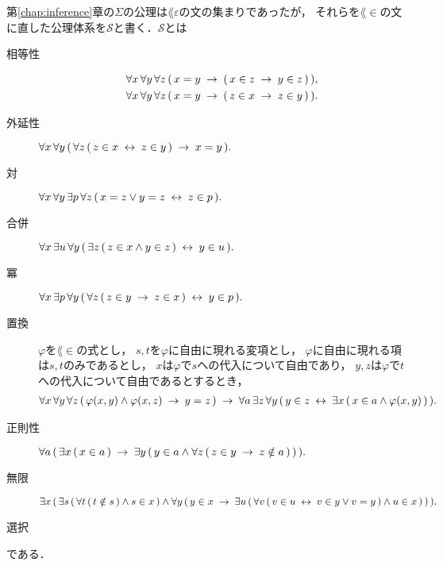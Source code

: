 	第\ref{chap:inference}章の$\Sigma$の公理は$\lang{\varepsilon}$の文の集まりであったが，
	それらを$\lang{\in}$の文に直した公理体系を$\mathscr{S}$と書く．$\mathscr{S}$とは
	\begin{description}
		\item[相等性] 
			\begin{align}
				&\forall x\, \forall y\, \forall z\, 
				(\, x = y \hspace{0.25em}\rightarrow\hspace{0.25em} (\, x \in z \hspace{0.25em}\rightarrow\hspace{0.25em} y \in z\, )\, ), \\
				&\forall x\, \forall y\, \forall z\, 
				(\, x = y \hspace{0.25em}\rightarrow\hspace{0.25em} (\, z \in x \hspace{0.25em}\rightarrow\hspace{0.25em} z \in y\, )\, ).
			\end{align}
			
		\item[外延性] $\forall x\, \forall y\, (\, \forall z\, 
			(\, z \in x \hspace{0.25em}\leftrightarrow\hspace{0.25em} z \in y\, ) \hspace{0.25em}\rightarrow\hspace{0.25em} x = y\, ).$
			
		\item[対] $\forall x\, \forall y\, \exists p\, \forall z\, 
			(\, x = z \vee y = z \hspace{0.25em}\leftrightarrow\hspace{0.25em} z \in p\, ).$
			
		\item[合併] $\forall x\, \exists u\, \forall y\, (\, \exists z\, (\, z \in x \wedge y \in z\, ) \hspace{0.25em}\leftrightarrow\hspace{0.25em} y \in u\, ).$
			
		\item[冪] $\forall x\, \exists p\, \forall y\, 
			(\, \forall z\, (\, z \in y \hspace{0.25em}\rightarrow\hspace{0.25em} z \in x\, ) \hspace{0.25em}\leftrightarrow\hspace{0.25em} y \in p\, ).$
			
		\item[置換] $\varphi$を$\lang{\in}$の式とし，
			$s,t$を$\varphi$に自由に現れる変項とし，
			$\varphi$に自由に現れる項は$s,t$のみであるとし，
			$x$は$\varphi$で$s$への代入について自由であり，
			$y,z$は$\varphi$で$t$への代入について自由であるとするとき，
			\begin{align}
				\forall x\, \forall y\, \forall z\, 
				(\, \varphi(x,y) \wedge \varphi(x,z)
				\hspace{0.25em}\rightarrow\hspace{0.25em} y = z\, )
				\hspace{0.25em}\rightarrow\hspace{0.25em} \forall a\, \exists z\, \forall y\,
				(\, y \in z \hspace{0.25em}\leftrightarrow\hspace{0.25em} \exists x\, (\, x \in a \wedge 
				\varphi(x,y)\, )\, ).
			\end{align}
			
		\item[正則性] $\forall a\, (\, \exists x\, (\, x \in a\, ) \hspace{0.25em}\rightarrow\hspace{0.25em}
				\exists y\, (\, y \in a \wedge \forall z\, (\, z \in y \hspace{0.25em}\rightarrow\hspace{0.25em}
				z \notin a\, )\, )\, ).$
			
		\item[無限] $\exists x\, (\, 
				\exists s\, (\, \forall t\, (\, t \notin s\, ) \wedge s \in x\, ) 
				\wedge \forall y\, (\, 
				y \in x \hspace{0.25em}\rightarrow\hspace{0.25em} \exists u\, (\, 
				\forall v\, (\, v \in u \hspace{0.25em}\leftrightarrow\hspace{0.25em} v \in y \vee v = y\, )
				\wedge u \in x\, )\, )\, ).$
			
		\item[選択]
			
	\end{description}
	である．
	

